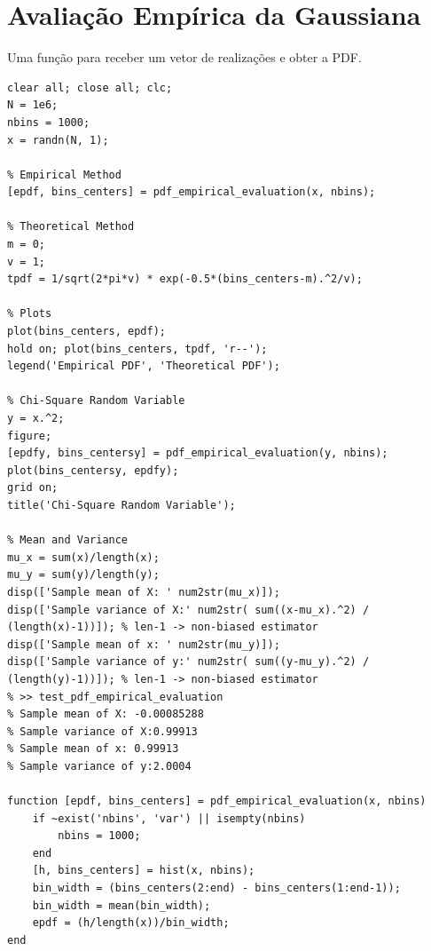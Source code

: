 \documentclass{article}
\begin{document}
\section{Avaliação Empírica da Gaussiana}
Uma função para receber um vetor de realizações e obter a PDF.
\begin{verbatim}
clear all; close all; clc;
N = 1e6;
nbins = 1000;
x = randn(N, 1);

% Empirical Method
[epdf, bins_centers] = pdf_empirical_evaluation(x, nbins);

% Theoretical Method
m = 0;
v = 1;
tpdf = 1/sqrt(2*pi*v) * exp(-0.5*(bins_centers-m).^2/v);

% Plots
plot(bins_centers, epdf);
hold on; plot(bins_centers, tpdf, 'r--');
legend('Empirical PDF', 'Theoretical PDF');

% Chi-Square Random Variable
y = x.^2;
figure;
[epdfy, bins_centersy] = pdf_empirical_evaluation(y, nbins);
plot(bins_centersy, epdfy);
grid on;
title('Chi-Square Random Variable');

% Mean and Variance
mu_x = sum(x)/length(x);
mu_y = sum(y)/length(y);
disp(['Sample mean of X: ' num2str(mu_x)]);
disp(['Sample variance of X:' num2str( sum((x-mu_x).^2) / (length(x)-1))]); % len-1 -> non-biased estimator
disp(['Sample mean of x: ' num2str(mu_y)]);
disp(['Sample variance of y:' num2str( sum((y-mu_y).^2) / (length(y)-1))]); % len-1 -> non-biased estimator
% >> test_pdf_empirical_evaluation
% Sample mean of X: -0.00085288
% Sample variance of X:0.99913
% Sample mean of x: 0.99913
% Sample variance of y:2.0004

function [epdf, bins_centers] = pdf_empirical_evaluation(x, nbins)
    if ~exist('nbins', 'var') || isempty(nbins)
        nbins = 1000;
    end
    [h, bins_centers] = hist(x, nbins);
    bin_width = (bins_centers(2:end) - bins_centers(1:end-1));
    bin_width = mean(bin_width);
    epdf = (h/length(x))/bin_width;
end

\end{verbatim}
\end{document}
